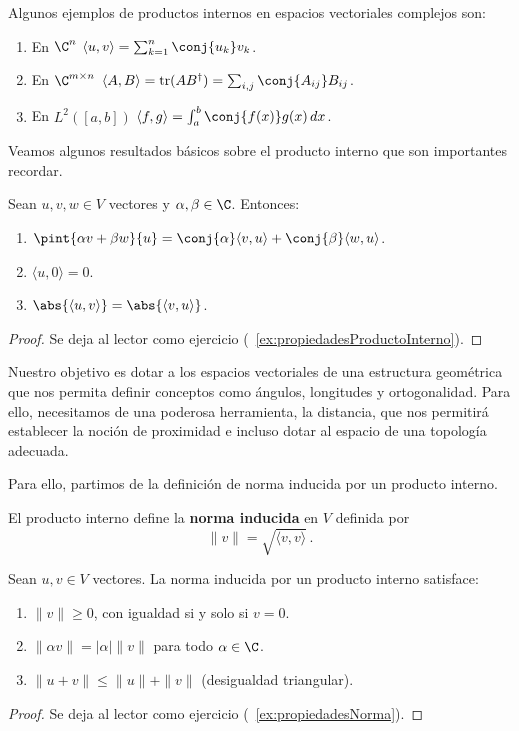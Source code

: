 \begin{eje}
  Algunos ejemplos de productos internos en espacios vectoriales complejos son:
  \begin{enumerate}
    \item En $\C^n$ $\langle u, v \rangle = \sum_{k=1}^n  \conj{u_k}v_k$.

    \item En $\C^{m \times n}$ $\langle A, B \rangle = \text{tr}(A B^\dagger) = \sum_{i,j} \conj{A_{ij}}B_{ij}$.

    \item En $L^2([a,b])$ $\langle f, g \rangle = \int_a^b \conj{f(x)}g(x) \, dx$.
  \end{enumerate}
\end{eje}
Veamos algunos resultados básicos sobre el producto interno que son importantes recordar.
\begin{prop}
  \label{prop:propiedadesProductoInterno}
  Sean $u,v,w \in V$ vectores y $\alpha, \beta \in \C$. Entonces:
  \begin{enumerate}
    \item $\pint{\alpha v + \beta w}{u} = \conj{\alpha}\langle v, u\rangle + \conj{\beta}\langle w, u\rangle$.
    \item $\langle u, 0 \rangle = 0$.
    \item $\abs{\langle u, v \rangle} = \abs{\langle v, u \rangle}$.
  \end{enumerate}
\end{prop}
\begin{proof}
  Se deja al lector como ejercicio (~\ref{ex:propiedadesProductoInterno}).
\end{proof}

Nuestro objetivo es dotar a los espacios vectoriales de una estructura geométrica que nos permita definir conceptos como ángulos, longitudes y ortogonalidad. Para ello, necesitamos de una poderosa herramienta, la distancia, que nos permitirá establecer la noción de proximidad e incluso dotar al espacio de una topología adecuada.

Para ello, partimos de la definición de norma inducida por un producto interno.
\begin{defi}
  El producto interno define la \textbf{norma inducida} en $V$ definida por
  \[
    \|v\| = \sqrt{\langle v, v \rangle}\,.
  \]
\end{defi}

\begin{prop}
  \label{prop:propiedadesNorma}
  Sean $u,v \in V$ vectores. La norma inducida por un producto interno satisface:
  \begin{enumerate}
    \item $\|v\| \geq 0$, con igualdad si y solo si $v = 0$.
    \item $\|\alpha v\| = |\alpha| \|v\|$ para todo $\alpha \in \C$.
    \item $\|u + v\| \leq \|u\| + \|v\|$ (desigualdad triangular).
  \end{enumerate}
\end{prop}
\begin{proof}
  Se deja al lector como ejercicio (~\ref{ex:propiedadesNorma}).
\end{proof}

